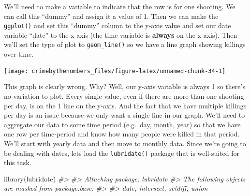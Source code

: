 \documentclass[
  12pt,
]{book}
\newenvironment{Shaded}{\begin{snugshade}}{\end{snugshade}}
\newcommand{\AttributeTok}[1]{\textcolor[rgb]{0.61,0.61,0.61}{#1}}
\newcommand{\CommentTok}[1]{\textcolor[rgb]{0.37,0.37,0.37}{\textit{#1}}}
\newcommand{\DecValTok}[1]{\textcolor[rgb]{0.06,0.06,0.06}{#1}}
\newcommand{\FunctionTok}[1]{\textcolor[rgb]{0,0,0}{#1}}
\newcommand{\NormalTok}[1]{#1}
\newcommand{\OtherTok}[1]{\textcolor[rgb]{0.37,0.37,0.37}{#1}}
\newcommand{\SpecialCharTok}[1]{\textcolor[rgb]{0,0,0}{#1}}
\begin{document}
We'll need to make a variable to indicate that the row is for one shooting. We can call this ``dummy'' and assign it a value of 1. Then we can make the \texttt{ggplot()} and set this ``dummy'' column to the y-axis value and set our date variable ``date'' to the x-axis (the time variable is \textbf{always} on the x-axis). Then we'll set the type of plot to \texttt{geom\_line()} so we have a line graph showing killings over time.

\begin{Shaded}
\end{Shaded}

\begin{center}\texttt{[image: crimebythenumbers\_files/figure-latex/unnamed-chunk-34-1]} \end{center}

This graph is clearly wrong. Why? Well, our y-axis variable is always 1 so there's no variation to plot. Every single value, even if there are more than one shooting per day, is on the 1 line on the y-axis. And the fact that we have multiple killings per day is an issue because we only want a single line in our graph. We'll need to aggregate our data to some time period (e.g.~day, month, year) so that we have one row per time-period and know how many people were killed in that period. We'll start with yearly data and then move to monthly data. Since we're going to be dealing with dates, lets load the \texttt{lubridate()} package that is well-suited for this task.

\begin{Shaded}
\begin{Highlighting}[]
\FunctionTok{library}\NormalTok{(lubridate)}
\CommentTok{\#\textgreater{} }
\CommentTok{\#\textgreater{} Attaching package: \textquotesingle{}lubridate\textquotesingle{}}
\CommentTok{\#\textgreater{} The following objects are masked from \textquotesingle{}package:base\textquotesingle{}:}
\CommentTok{\#\textgreater{} }
\CommentTok{\#\textgreater{}     date, intersect, setdiff, union}
\end{Highlighting}
\end{Shaded}
\end{document}
